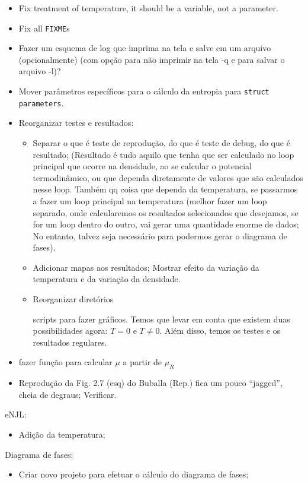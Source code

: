 \begin{itemize}
	\item Fix treatment of temperature, it should be a variable, not a parameter.
	\item Fix all \texttt{FIXME}s
	\item Fazer um esquema de log que imprima na tela e salve em um arquivo (opcionalmente) (com opção para não imprimir na tela -q e para salvar o arquivo -l)?
	\item Mover parâmetros específicos para o cálculo da entropia para \texttt{struct parameters}.
	\item Reorganizar testes e resultados:
		\begin{itemize}
			\item Separar o que é teste de reprodução, do que é teste de debug, do que é resultado; (Resultado é tudo aquilo que tenha que ser calculado no loop principal que ocorre na densidade, ao se calcular o potencial termodinâmico, ou que dependa diretamente de valores que são calculados nesse loop. Também qq coisa que dependa da temperatura, se passarmos a fazer um loop principal na temperatura (melhor fazer um loop separado, onde calcularemos os resultados selecionados que desejamos, se for um loop dentro do outro, vai gerar uma quantidade enorme de dados; No entanto, talvez seja necessário para podermos gerar o diagrama de fases).
			\item Adicionar mapas aos resultados; Mostrar efeito da variação da temperatura e da variação da densidade.
			\item Reorganizar diretórios

		scripts para fazer gráficos. Temos que levar em conta que existem duas possibilidades agora: $T = 0$ e $T \neq 0$. Além disso, temos os testes e os resultados regulares.
		\end{itemize}
	\item fazer função para calcular $\mu$ a partir de $\mu_R$
	\item Reprodução da Fig. 2.7 (esq) do Buballa (Rep.) fica um pouco ``jagged'', cheia de degraus; Verificar.
\end{itemize}

eNJL:
\begin{itemize}
	\item Adição da temperatura;
\end{itemize}

Diagrama de fases:
\begin{itemize}
	\item Criar novo projeto para efetuar o cálculo do diagrama de fases;
\end{itemize}
